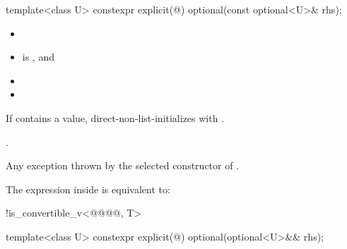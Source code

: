 %
\begin{itemdecl}
template<class U>
  constexpr explicit(@\seebelow@) optional(const optional<U>& rhs);
\end{itemdecl}

\begin{itemdescr}
\pnum
\constraints
\begin{itemize}
\item {}\added{,}
\item {} is , and
\item {}\removed{, }
\item {}
\end{itemize}

\pnum
\effects
If  contains a value, direct-non-list-initializes  with .

\pnum
\ensures
{}.

\pnum
\throws
Any exception thrown by the selected constructor of .

\pnum
\remarks
The expression inside  is equivalent to:
\begin{codeblock}
!is_convertible_v<@@@@, T>
\end{codeblock}
\end{itemdescr}

%
\begin{itemdecl}
template<class U>
  constexpr explicit(@\seebelow@) optional(optional<U>&& rhs);
\end{itemdecl}

